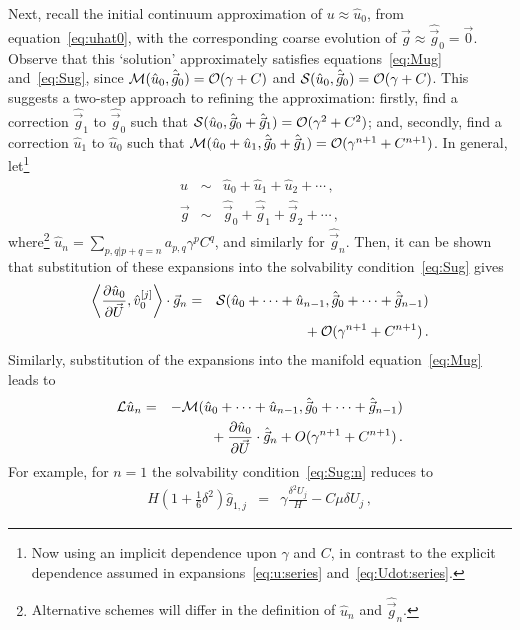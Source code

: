 \documentclass[12pt,a5paper]{article}
\begin{document}
Next, recall the initial continuum approximation of $u\approx\hat{u}_0$, from equation~\eqref{eq:uhat0},
with the corresponding coarse evolution of $\hat{\vec{g}}\approx\hat{\vec{g}}_0=\vec{0}$. Observe that this
`solution' approximately satisfies equations~\eqref{eq:Mug} and~\eqref{eq:Sug}, since
${\cal M}(\hat{u}_0,\hat{\vec{g}}_0)={\cal O}(\gamma+C)$ and
${\cal S}(\hat{u}_0,\hat{\vec{g}}_0)={\cal O}(\gamma+C)$.
This suggests a two-step approach to refining the approximation: firstly, find a correction
$\hat{\vec{g}}_1$ to $\hat{\vec{g}}_0$ such that ${\cal S}(\hat{u}_0,\hat{\vec{g}}_0+\hat{\vec{g}}_1)={\cal O}(\gamma^{2}+C^{2})$;
and, secondly, find a correction
$\hat{u}_1$ to $\hat{u}_0$ such that ${\cal M}(\hat{u}_0+\hat{u}_1,\hat{\vec{g}}_0+\hat{\vec{g}}_1)={\cal O}(\gamma^{n+1}+C^{n+1})$.
In general, let\footnote{Now using an implicit dependence 
upon $\gamma$ and $C$, in contrast to the explicit dependence assumed in expansions~\eqref{eq:u:series} and~\eqref{eq:Udot:series}.} 
\begin{eqnarray}
u & \sim & \hat{u}_0+\hat{u}_1+\hat{u}_2+\cdots\,,
\label{eq:new:u:series}
\\
\vec{g} & \sim & \hat{\vec{g}}_0+\hat{\vec{g}}_1+\hat{\vec{g}}_2+\cdots\,,
\label{eq:new:g:series}
\end{eqnarray}
where\footnote{Alternative schemes will differ in the definition of $\hat{u}_n$  and $\hat{\vec{g}}_n$.} 
$\hat{u}_n=\sum_{p,q|p+q=n}a_{p,q}\gamma^p C^q$, and similarly for $\hat{\vec{g}}_n$. 
Then, it can be shown that substitution of these expansions into the solvability condition~\eqref{eq:Sug} gives
\begin{eqnarray}
\left\langle\D {\vec U}{\hat{u}_0},\hat{v}_0^{[j]}\right\rangle\cdot\vec{g}_n & = &
{\cal S}(\hat{u}_0+\cdots+\hat{u}_{n-1},
\hat{\vec{g}}_0+\cdots+\hat{\vec{g}}_{n-1})
\nonumber\\
&&{}+{\cal O}(\gamma^{n+1}+C^{n+1})\,.
\label{eq:Sug:n}
\end{eqnarray}
Similarly, substitution of the expansions into the manifold equation~\eqref{eq:Mug} leads to
\begin{eqnarray}
{\cal L}\hat{u}_n & = & -{\cal M}(\hat{u}_0+\cdots+\hat{u}_{n-1},
\hat{\vec{g}}_0+\cdots+\hat{\vec{g}}_{n-1})
\nonumber\\
&&{}+\D{\vec{U}}{\hat{u}_0}\cdot\hat{\vec{g}}_n+O(\gamma^{n+1}+C^{n+1})\,.
\end{eqnarray}
For example, for $n=1$ the solvability condition~\eqref{eq:Sug:n} reduces to
\begin{eqnarray}
	H\left(1+\frac{1}{6}\delta^2\right)\hat{g}_{1,j} & = & 
\gamma\frac{\delta^2U_j}{H} - C\mu\delta U_j\,,
\end{eqnarray}
\end{document}
